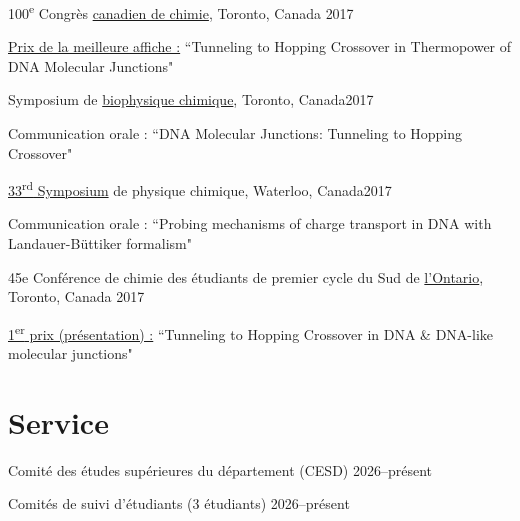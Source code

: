 \documentclass[margin,line]{res}
\newenvironment{list1}{
 \begin{list}{\ding{113}}{%
  \setlength{\itemsep}{0in}
  \setlength{\parsep}{0in} \setlength{\parskip}{0in}
  \setlength{\topsep}{0in} \setlength{\partopsep}{0in} 
  \setlength{\leftmargin}{0.17in}}}{\end{list}}
\begin{document}
\begin{resume}
100\textsuperscript{e} Congrès \href{https://www.cheminst.ca/magazine/article/csc-celebrates-100-years-of-chemistry-in-toronto/}{canadien de chimie}, Toronto, Canada \hfill {2017}

\begin{list1}
\item[]\underline{Prix de la meilleure affiche :} ``Tunneling to Hopping Crossover in Thermopower of DNA Molecular Junctions" 
\end{list1}

Symposium de \href{www.chembiophys.ca}{biophysique chimique}, Toronto, Canada\hfill{2017}

\begin{list1}
\item[]Communication orale : ``DNA Molecular Junctions:  Tunneling to Hopping Crossover"
\end{list1}

\vspace*{-1mm}

\href{http://scp.uwaterloo.ca}{33\textsuperscript{rd} Symposium} de physique chimique, Waterloo, Canada\hfill{2017}

\begin{list1}
\item[]Communication orale : ``Probing mechanisms of charge transport in DNA with Landauer-B\"uttiker formalism"
\end{list1}

\vspace*{-1mm}

45e Conférence de chimie des étudiants de premier cycle du Sud de \href{https://sites.google.com/view/souscc52/home}{l'Ontario}, Toronto, Canada \hfill{2017}

\begin{list1}
\item[]\underline{1\textsuperscript{er} prix (présentation) :}  ``Tunneling to Hopping Crossover in DNA \& DNA-like molecular junctions"
\end{list1}

\section{\sc Service}

Comité des études supérieures du département (CESD) \hfill{2026--présent}

\vspace*{-1mm}

Comités de suivi d'étudiants (3 étudiants) \hfill{2026--présent}


\end{resume}
\end{document}
